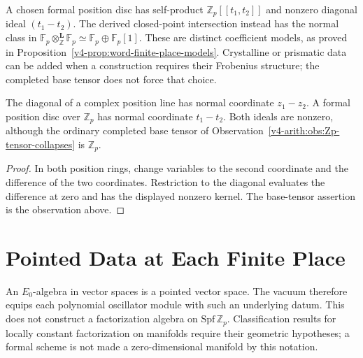 \begin{remark}
A chosen formal position disc has self-product
\(\mathbb Z_p[[t_1,t_2]]\) and nonzero diagonal ideal
\((t_1-t_2)\). The derived closed-point intersection instead has
the normal class in
\(\mathbb F_p\otimes_{\mathbb Z}^{\mathbf L}\mathbb F_p
 \simeq\mathbb F_p\oplus\mathbb F_p[1]\).
These are distinct coefficient models, as proved in
Proposition~\ref{v4-prop:word-finite-place-models}.
Crystalline or prismatic data can be added when a construction
requires their Frobenius structure; the completed base tensor
does not force that choice.
\end{remark}

\begin{theorem}
\label{v4-arith:thm:arch-vs-finite-asymmetry}
The diagonal of a complex position line has normal coordinate
\(z_1-z_2\). A formal position disc over \(\mathbb Z_p\) has
normal coordinate \(t_1-t_2\). Both ideals are nonzero, although
the ordinary completed base tensor of
Observation~\ref{v4-arith:obs:Zp-tensor-collapses} is \(\mathbb Z_p\).
\end{theorem}
\begin{proof}
In both position rings, change variables to the second coordinate
and the difference of the two coordinates. Restriction to the
diagonal evaluates the difference at zero and has the displayed
nonzero kernel. The base-tensor assertion is the observation above.
\end{proof}

\section{Pointed Data at Each Finite Place}
\label{v4-arith:cg:E0-finite-places}

\begin{remark}
\label{v4-arith:prop:locally-constant-discrete}
An \(E_0\)-algebra in vector spaces is a pointed vector space.
The vacuum therefore equips each polynomial oscillator module with such
an underlying datum. This does not construct a factorization algebra on
\(\mathrm{Spf}\,\mathbb Z_p\). Classification results for locally constant
factorization on manifolds require their geometric hypotheses; a formal
scheme is not made a zero-dimensional manifold by this notation.
\end{remark}

